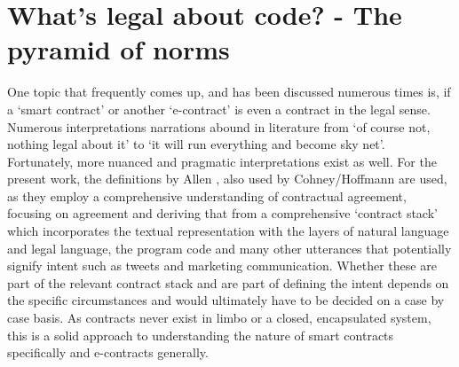 \documentclass{article}
\begin{document}
\section{What's legal about code? - The pyramid of norms}
One topic that frequently comes up, and has been discussed numerous times is, if a ‘smart contract’  or another ‘e-contract’  is even a contract in the legal sense. Numerous interpretations narrations abound in literature from ‘of course not, nothing legal about it’ to ‘it will run everything and become sky net’. Fortunately, more nuanced and pragmatic interpretations exist as well.
For the present work, the definitions by Allen \cite{allenWrappedStackedSmart2018}, also used by Cohney/Hoffmann \cite{cohneyTransactionalScriptsContract2020} are used, as they employ a comprehensive understanding of contractual agreement, focusing on agreement and deriving that from a comprehensive ‘contract stack’ which incorporates the textual representation with the layers of natural language and legal language, the program code 
and many other utterances that potentially signify intent such as tweets and marketing communication. Whether these are part of the relevant contract stack and are part of defining the intent depends on the specific circumstances and would ultimately have to be decided on a case by case basis. As contracts never exist in limbo or a closed, encapsulated system, this is a solid approach to understanding the nature of smart contracts specifically and e-contracts generally. 
\end{document}
